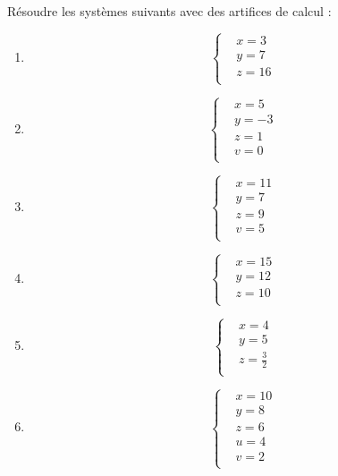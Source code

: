 \begin{solution}
Résoudre les systèmes suivants avec des artifices de calcul :
\begin{multicols}{3}
\begin{enumerate}
\item \[\left\{ \begin{array}{ll}
  & x=3 \\ 
 & y=7 \\ 
 & z=16 \\ 
\end{array} \right.\]
\item \[\left\{ \begin{array}{ll}
  & x=5 \\ 
 & y=-3 \\ 
 & z=1 \\ 
 & v=0 \\ 
\end{array} \right.\]
\item \[\left\{ \begin{array}{ll}
  & x=11 \\ 
 & y=7 \\ 
 & z=9 \\ 
 & v=5 \\ 
\end{array} \right.\]
\item \[\left\{ \begin{array}{ll}
  & x=15 \\ 
 & y=12 \\ 
 & z=10 \\ 
\end{array} \right.\]
\item \[\left\{ \begin{array}{ll}
  & x=4 \\ 
 & y=5 \\ 
 & z=\frac{3}{2} \\ 
\end{array} \right.\]
\item \[\left\{ \begin{array}{ll}
  & x=10 \\ 
 & y=8 \\ 
 & z=6 \\ 
 & u=4 \\ 
 & v=2 \\ 
\end{array} \right.\]
\end{enumerate}
\end{multicols}
\end{solution}

